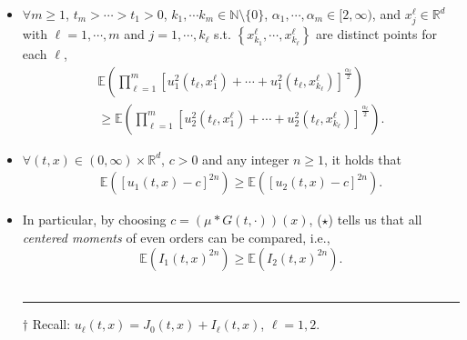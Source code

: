\documentclass[9pt,table,xcolor=dvipsnames]{beamer}%
\newcommand{\E}{\mathbb{E}}
\newcommand{\bbN}{\mathbb{N}}
\newcommand{\R}{\mathbb{R}}
\theoremstyle{definition}
\theoremstyle{plain}
\begin{document}
\begin{frame}
\begin{itemize}
    \item[Eg. 4~] $\forall m\ge 1$, $t_m>\cdots >t_1>0$,  $k_1,\cdots k_m\in\bbN\setminus\{0\}$, $\alpha_1,\cdots,\alpha_m\in [2,\infty)$, and $x_{j}^\ell\in\R^d$ with $\ell=1,\cdots,m$ and $j=1,\cdots,k_\ell$ s.t.  $\left\{x_{k_1}^\ell,\cdots,x_{k_\ell}^\ell\right\}$ are distinct points for each $\ell$, \\
      \begin{multline*}
        \E\left(
        \prod_{\ell=1}^m \left[u_1^2\left(t_\ell,x_{1}^\ell\right)+\cdots+ u_1^2\left(t_\ell,x_{k_\ell}^\ell\right)\right]^{\frac{\alpha_\ell}{2}}
        \right)\\
        \ge
        \E\left(
        \prod_{\ell=1}^m \left[u_2^2\left(t_\ell,x_{1}^\ell \right)+ \cdots+u_2^2\left(t_\ell,x_{k_\ell}^\ell \right)\right]^{\frac{\alpha_\ell}{2}}
        \right).
      \end{multline*}
\end{itemize}
\end{frame}
\begin{frame}
\begin{itemize}
  \item[Eg. 5~] $\forall (t,x)\in(0,\infty)\times\R^d$, $c> 0$ and any integer $n\ge 1$, it holds that\\
    \begin{align}\tag{$\star$}
      \E\left(\left[u_1(t,x)-c\right]^{2n}\right) \ge
      \E\left(\left[u_2(t,x)-c\right]^{2n}\right).
    \end{align}
    \vspace{0.5em}
  \item[] In particular, by choosing $c=(\mu * G(t,\cdot))(x)$, ($\star$) tells us that all \textcolor{yellow!75!black}{\it centered moments} of even orders can be compared, i.e.,
  \vspace{0.5em}
    \[
      \E\left(I_1(t,x)^{2n}\right) \ge
      \E\left(I_2(t,x)^{2n}\right).
    \]
    \vspace{2.5em}\\
    \noindent\textcolor{gray}{\rule{4cm}{0.6pt}}
    \begin{minipage}{0.7\textwidth}
      \footnotesize
      $\dagger$ Recall: $u_\ell(t,x) = J_0(t,x) +I_\ell(t,x)$, $\ell = 1,2.$
    \end{minipage}
\end{itemize}
\end{frame}
\end{document}
